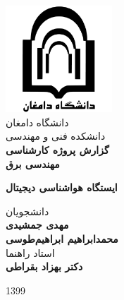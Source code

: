 \begin{titlepage}
	\begin{center}
		\includegraphics[width=0.3\textwidth]{Assets/logo.pdf}\\
		\smallskip \LARGE
		{دانشگاه دامغان}\\
		{دانشکده فنی و مهندسی}\\
		
		\vspace{1cm} \LARGE
		\textbf{گزارش پروژه کارشناسی\\مهندسی برق}\\
		
		\vspace{1cm}
		
		\huge
		\textbf{ایستگاه هواشناسی دیجیتال}
		
		\LARGE
		\vspace{3cm}
		{دانشجویان}\\
		\vspace{0.25cm}
		\textbf{مهدی جمشیدی\\محمدابراهیم ابراهیم‌طوسی}\\
		
		\vspace{1.2cm}
		{استاد راهنما}\\
		\vspace{0.25cm}
		\textbf{دکتر بهزاد بقراطی}
		
		\vfill
		{1399}
	\end{center}
\end{titlepage}